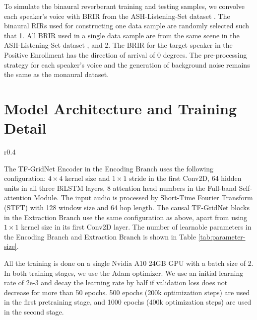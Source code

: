 To simulate the binaural reverberant training and testing samples, we convolve each speaker's voice with BRIR from the ASH-Listening-Set dataset \cite{ASH-brir}. The binaural RIRs used for constructing one data sample are randomly selected such that 1. All BRIR used in a single data sample are from the same scene in the ASH-Listening-Set dataset \cite{ASH-brir}, and 2. The BRIR for the target speaker in the Positive Enrollment has the direction of arrival of 0 degrees. 
The pre-processing strategy for each speaker's voice and the generation of background noise remains the same as the monaural dataset.


\section{Model Architecture and Training Detail}

\begin{wraptable}{r}{0.4\columnwidth} %
\vskip -0.3in
\caption{The number of learnable parameters of each model component.}
\label{tab:parameter-size}
\vskip 0.1in
\centering
\end{wraptable}

The TF-GridNet Encoder in the Encoding Branch uses the following configuration: $4 \times 4$ kernel size and $1 \times 1$ stride in the first Conv2D, 64 hidden units in all three BiLSTM layers, 8 attention head numbers in the Full-band Self-attention Module. The input audio is processed by Short-Time Fourier Transform (STFT) with 128 window size and 64 hop length. The causal TF-GridNet blocks in the Extraction Branch use the same configuration as above, apart from using  $1 \times 1$ kernel size in its first Conv2D layer. The number of learnable parameters in the Encoding Branch and Extraction Branch is shown in Table \ref{tab:parameter-size}. 

All the training is done on a single Nvidia A10 24GB GPU with a batch size of 2. In both training stages, we use the Adam optimizer. We use an initial learning rate of 2e-3 and decay the learning rate by half if validation loss does not decrease for more than 50 epochs. 500 epochs (200k optimization steps) are used in the first pretraining stage, and 1000 epochs (400k optimization steps) are used in the second stage. 

